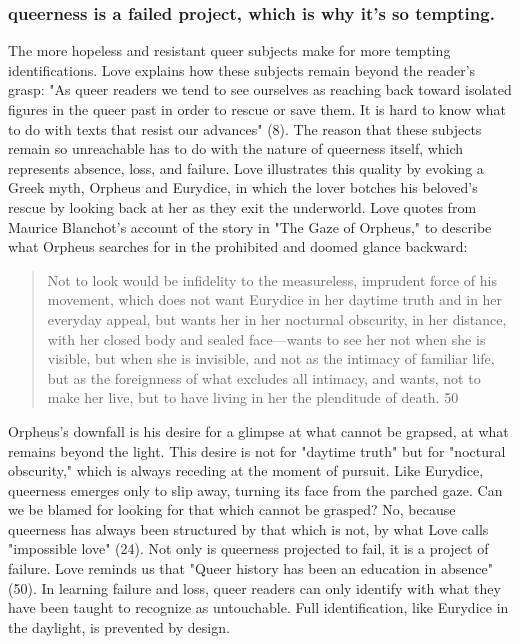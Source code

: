 \documentclass[11pt]{article}
\begin{document}
\subsubsection{queerness is a failed project, which is why it's so tempting.}
\label{sec:org1d3c91a}
The more hopeless and resistant queer subjects make for more tempting
identifications. Love explains how these subjects remain beyond the
reader's grasp: "As queer readers we tend to see ourselves as reaching
back toward isolated figures in the queer past in order to rescue or
save them. It is hard to know what to do with texts that resist our
advances" (8). The reason that these subjects remain so unreachable
has to do with the nature of queerness itself, which represents
absence, loss, and failure. Love illustrates this quality by evoking a
Greek myth, Orpheus and Eurydice, in which the lover botches his
beloved's rescue by looking back at her as they exit the
underworld. Love quotes from Maurice Blanchot's account of the story
in "The Gaze of Orpheus," to describe what Orpheus searches for in the
prohibited and doomed glance backward:

\begin{quote}
Not to look would be infidelity to the measureless, imprudent force
of his movement, which does not want Eurydice in her daytime truth and
in her everyday appeal, but wants her in her nocturnal obscurity, in
her distance, with her closed body and sealed face---wants to see her
not when she is visible, but when she is invisible, and not as the
intimacy of familiar life, but as the foreignness of what excludes all
intimacy, and wants, not to make her live, but to have living in her
the plenditude of death. 50
\end{quote}

Orpheus's downfall is his desire for a glimpse at what cannot be
grapsed, at what remains beyond the light. This desire is not for
"daytime truth" but for "noctural obscurity," which is always receding
at the moment of pursuit. Like Eurydice, queerness emerges only to
slip away, turning its face from the parched gaze. Can we be blamed
for looking for that which cannot be grasped? No, because queerness
has always been structured by that which is not, by what Love calls
"impossible love" (24). Not only is queerness projected to fail, it is
a project of failure. Love reminds us that "Queer history has been an
education in absence" (50). In learning failure and loss, queer
readers can only identify with what they have been taught to recognize
as untouchable. Full identification, like Eurydice in the daylight, is
prevented by design.
\end{document}
